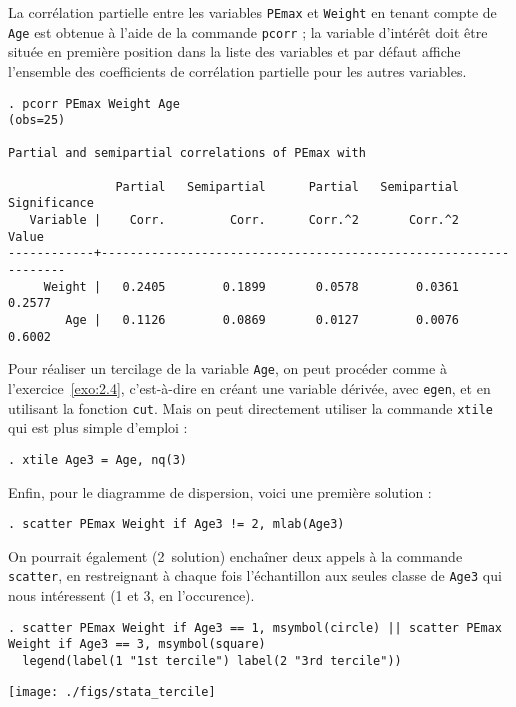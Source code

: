 La corrélation partielle entre les variables \texttt{PEmax} et
\texttt{Weight} en tenant compte de \texttt{Age} est obtenue à l'aide de la
commande \texttt{pcorr} ; la variable d'intérêt doit être située en première
position dans la liste des variables et par défaut \Stata affiche l'ensemble
des coefficients de corrélation partielle pour les autres variables.
\begin{verbatim}
. pcorr PEmax Weight Age
(obs=25)

Partial and semipartial correlations of PEmax with

               Partial   Semipartial      Partial   Semipartial   Significance
   Variable |    Corr.         Corr.      Corr.^2       Corr.^2          Value
------------+-----------------------------------------------------------------
     Weight |   0.2405        0.1899       0.0578        0.0361         0.2577
        Age |   0.1126        0.0869       0.0127        0.0076         0.6002
\end{verbatim}
Pour réaliser un tercilage de la variable \texttt{Age}, on peut procéder comme à
l'exercice~\ref{exo:2.4}, c'est-à-dire en créant une variable dérivée, avec
\texttt{egen}, et en utilisant la fonction \texttt{cut}. Mais on peut
directement utiliser la commande \texttt{xtile} qui est plus simple d'emploi :
\begin{verbatim}
. xtile Age3 = Age, nq(3)
\end{verbatim}
Enfin, pour le diagramme de dispersion, voici une première solution :
\begin{verbatim}
. scatter PEmax Weight if Age3 != 2, mlab(Age3)
\end{verbatim}
On pourrait également (2\ieme\ solution) enchaîner deux appels à la commande
\texttt{scatter}, en restreignant à chaque fois l'échantillon aux seules
classe de \texttt{Age3} qui nous intéressent (1 et 3, en l'occurence).
\begin{verbatim}
. scatter PEmax Weight if Age3 == 1, msymbol(circle) || scatter PEmax Weight if Age3 == 3, msymbol(square) 
  legend(label(1 "1st tercile") label(2 "3rd tercile"))
\end{verbatim}

\texttt{[image: ./figs/stata\_tercile]}

